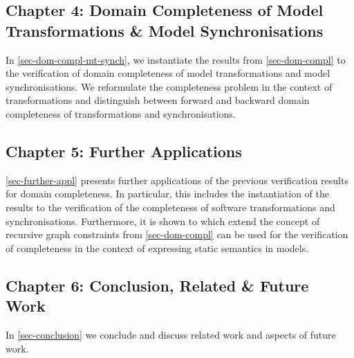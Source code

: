 \subsection{Chapter 4: Domain Completeness of Model Transformations \& Model Synchronisations}
In \cref{sec-dom-compl-mt-synch}, we instantiate the results from \cref{sec-dom-compl} to the verification of domain completeness of model transformations and model synchronisations.
We reformulate the completeness problem in the context of transformations and distinguish between forward and backward domain completeness of transformations and synchronisations.

\subsection{Chapter 5: Further Applications}
\cref{sec-further-appl} presents further applications of the previous verification results for domain completeness.
In particular, this includes the instantiation of the results to the verification of the completeness of software transformations and synchronisations.
Furthermore, it is shown to which extend the concept of recursive graph constraints from \cref{sec-dom-compl} can be used for the verification of completeness in the context of expressing static semantics in models.

\subsection{Chapter 6: Conclusion, Related \& Future Work}
In \cref{sec-conclusion} we conclude and discuss related work and aspects of future work.